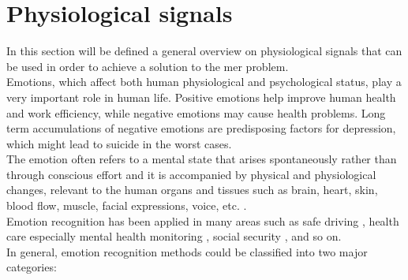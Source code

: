 \section{Physiological signals}
In this section will be defined a general overview on physiological signals that can be used in order to achieve a solution to the \gls{mer} problem.
\\ \indent
Emotions, which affect both human physiological and psychological status, play a very important role in human life. Positive emotions help improve human health and work efficiency, while negative emotions may cause health problems. Long term accumulations of negative emotions are predisposing factors for depression, which might lead to suicide in the worst cases.
\\
The emotion often refers to a mental state that arises spontaneously rather than through conscious effort and it is accompanied by physical and physiological changes, relevant to the human organs and tissues such as brain, heart, skin, blood flow, muscle, facial expressions, voice, etc. \cite{shu2018review}.
\\ \indent
Emotion recognition has been applied in many areas such as safe driving \cite{de2016enhancing}, health care especially mental health monitoring \cite{guo2013pervasive}, social security \cite{verschuere2006psychopathy}, and so on.
\\
In general, emotion recognition methods could be classified into two major categories:

